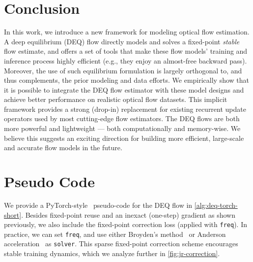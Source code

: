 \documentclass[10pt,twocolumn,letterpaper]{article}
\begin{document}
\vspace{-0.2cm}
\section{Conclusion}
\label{sec:conclusion}

In this work, we introduce a new framework for modeling optical flow estimation. A deep equilibrium (DEQ) flow directly models and solves a fixed-point \emph{stable} flow estimate, and offers a set of tools that make these flow models' training and inference process highly efficient (e.g., they enjoy an almost-free backward pass). Moreover, the use of such equilibrium formulation is largely orthogonal to, and thus complements, the prior modeling and data efforts. We empirically show that it is possible to integrate the DEQ flow estimator with these model designs and achieve better performance on realistic optical flow datasets.
This implicit framework provides a strong (drop-in) replacement for existing recurrent update operators used by most cutting-edge flow estimators. The DEQ flows are both more powerful and lightweight --- both computationally and memory-wise. We believe this suggests an exciting direction for building more efficient, large-scale and accurate flow models in the future.

{\small


}

\clearpage
\appendix

\section{Pseudo Code}

We provide a PyTorch-style~\cite{pythorch} pseudo-code for the DEQ flow in \cref{alg:deq-torch-short}. Besides fixed-point reuse and an inexact (one-step) gradient as shown previously, we also include the fixed-point correction loss (applied with \texttt{freq}). In practice, we can set \texttt{freq}, and use either Broyden's method~\cite{broyden1965class} or Anderson acceleration~\cite{anderson1965} as \texttt{solver}. This sparse fixed-point correction scheme encourages stable training dynamics, which we analyze further in \cref{fig:jr-correction}.
\end{document}
